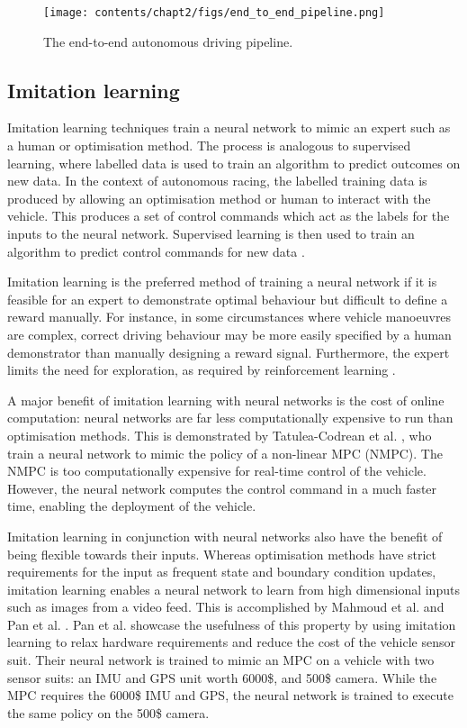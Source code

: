 \begin{figure}[h]
    \centering
    \texttt{[image: contents/chapt2/figs/end\_to\_end\_pipeline.png]}
    \caption{The end-to-end autonomous driving pipeline.}
    \label{fig:end_to_end}
\end{figure}

\subsection{Imitation learning}
\label{sec:imitation_learning}

Imitation learning techniques train a neural network to mimic an expert such as a human or optimisation method.
The process is analogous to supervised learning, where labelled data is used to train an algorithm to predict outcomes on new data.
In the context of autonomous racing, the labelled training data is produced by allowing an optimisation method or human to interact with the vehicle.
This produces a set of control commands which act as the labels for the inputs to the neural network.
Supervised learning is then used to train an algorithm to predict control commands for new data \cite{Osa_2018}.

Imitation learning is the preferred method of training a neural network if it is feasible for an expert to demonstrate optimal behaviour but difficult to define a reward manually.
For instance, in some circumstances where vehicle manoeuvres are complex, correct driving behaviour may be more easily specified by a human demonstrator than manually designing a reward signal.
Furthermore, the expert limits the need for exploration, as required by reinforcement learning \cite{Osa_2018}.

A major benefit of imitation learning with neural networks is the cost of online computation: neural networks are far less computationally expensive to run than optimisation methods. This is demonstrated by Tatulea-Codrean et al. \cite{Tatulea-Codrean2020}, who train a neural network to mimic the policy of a non-linear MPC (NMPC). The NMPC is too computationally expensive for real-time control of the vehicle. 
However, the neural network computes the control command in a much faster time, enabling the deployment of the vehicle.

Imitation learning in conjunction with neural networks also have the benefit of being flexible towards their inputs. Whereas optimisation methods have strict requirements for the input as frequent state and boundary condition updates, imitation learning enables a neural network to learn from high dimensional inputs such as images from a video feed. This is accomplished by Mahmoud et al. \cite{Mahmoud2020} and Pan et al. \cite{Pan2017a}. 
Pan et al. \cite{Pan2017a} showcase the usefulness of this property by using imitation learning to relax hardware requirements and reduce the cost of the vehicle sensor suit. 
Their neural network is trained to mimic an MPC on a vehicle with two sensor suits: an IMU and GPS unit worth 6000\$, and 500\$ camera.
While the MPC requires the 6000\$ IMU and GPS, the neural network is trained to execute the same policy on the 500\$ camera.

